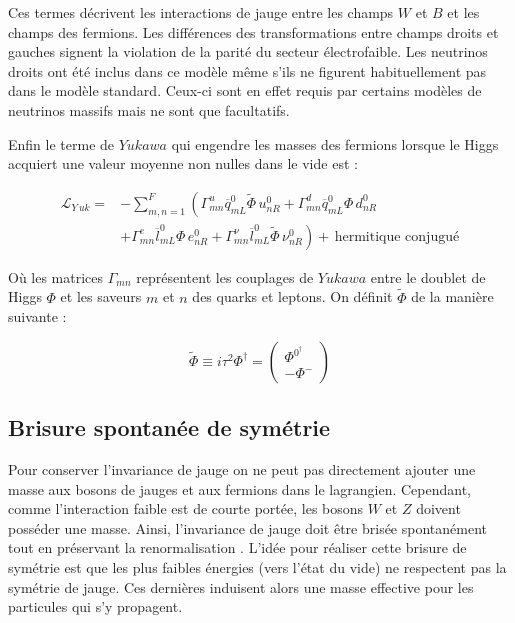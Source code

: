   Ces termes d\'ecrivent les interactions de jauge entre les champs $W$ et $B$ et les champs des fermions. Les diff\'erences des transformations entre champs droits et gauches signent la violation de la parit\'e du secteur \'electrofaible. Les neutrinos droits ont \'et\'e inclus dans ce mod\`ele m\^eme s'ils ne figurent habituellement pas dans le mod\`ele standard. Ceux-ci sont en effet requis par certains mod\`eles de neutrinos massifs mais ne sont que facultatifs.
  
  \medskip
  
  Enfin le terme de $Yukawa$ qui engendre les masses des fermions lorsque le Higgs acquiert une valeur moyenne non nulles dans le vide est :
  
  \begin{align}
   \mathcal{L}_{Y \, uk} = & - \sum_{m,n = 1}^F \left( \Gamma^u_{mn} \overline{q}_{mL}^0 \widetilde{\Phi} \, u_{nR}^0 + \Gamma^d_{mn} \overline{q}_{mL}^0 \Phi \, d_{nR}^0 \right. \\ \nonumber 
   & + \left. \Gamma^e_{mn} \overline{l}_{mL}^0 \Phi \, e_{nR}^0 + \Gamma^{\nu}_{mn} \overline{l}_{mL}^0 \widetilde{\Phi} \, {\nu}_{nR}^0  \right) + \, \text{hermitique conjugu\'e} \nonumber
  \end{align}

  O\`u les matrices $\Gamma_{mn}$ repr\'esentent les couplages de $Yukawa$ entre le doublet de Higgs $\Phi$ et les saveurs $m$ et $n$ des quarks et leptons. On d\'efinit $\widetilde{\Phi}$ de la mani\`ere suivante :
  
  \begin{equation}
   \widetilde{\Phi} \equiv i \tau^2 \Phi^{\dagger} = \begin{pmatrix} \Phi^{0^\dagger} \\ - \Phi^- \end{pmatrix}
  \end{equation}
  
  \subsection{Brisure spontan\'ee de sym\'etrie}
  \label{sect:brisureSymHiggs}
  
  Pour conserver l'invariance de jauge on ne peut pas directement ajouter une masse aux bosons de jauges et aux fermions dans le lagrangien. Cependant, comme l'interaction faible est de courte port\'ee, les bosons $W$ et $Z$ doivent poss\'eder une masse. Ainsi, l'invariance de jauge doit \^etre bris\'ee spontan\'ement \cite{Schwinger:1962tn, PhysRev.130.439, Higgs:1964pj, PhysRev.145.1156, PhysRevLett.13.321, PhysRevLett.13.585} tout en pr\'eservant la renormalisation \cite{'tHooft:1971rn, 'tHooft:1972ue, Lee:1972fj, Lee:1973fn}. L'id\'ee pour r\'ealiser cette brisure de sym\'etrie est que les plus faibles \'energies (vers l'état du vide) ne respectent pas la sym\'etrie de jauge. Ces derni\`eres induisent alors une masse effective pour les particules qui s'y propagent.
  

